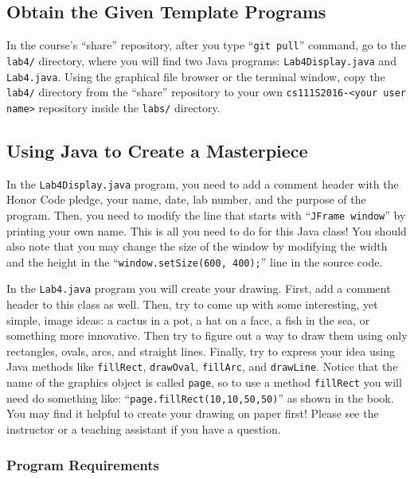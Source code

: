 \vspace{-0.05in}
\subsection*{Obtain the Given Template Programs}
\vspace{-0.05in}

In the course's ``share'' repository, after you type ``{\tt git pull}'' command, go to the {\tt lab4/} directory, where
you will find two Java programs: {\tt Lab4Display.java} and {\tt Lab4.java}. Using the graphical file browser or the
terminal window, copy the {\tt lab4/} directory from the ``share'' repository to your own {\tt cs111S2016-<your user
name>} repository inside the {\tt labs/} directory.

\subsection*{Using Java to Create a Masterpiece}

In the {\tt Lab4Display.java} program, you need to add a comment header with the Honor Code pledge, your name, date, lab
number, and the purpose of the program. Then, you need to modify the line that starts with ``{\tt JFrame window}'' by
printing your own name. This is all you need to do for this Java class! You should also note that you may change the size of
the window by modifying the width and the height in the ``{\tt window.setSize(600, 400);}'' line in the source code.

In the {\tt Lab4.java} program you will create your drawing. First, add a comment header to this class as well.  Then,
try to come up with some interesting, yet simple, image ideas: a cactus in a pot, a hat on a face, a fish in the sea, or
something more innovative.  Then try to figure out a way to draw them using only rectangles, ovals, arcs, and straight
lines.  Finally, try to express your idea using Java methods like {\tt fillRect}, {\tt drawOval}, {\tt fillArc}, and
{\tt drawLine}. Notice that the name of the graphics object is called {\tt page}, so to use a method {\tt fillRect} you
will need do something like: ``{\tt page.fillRect(10,10,50,50)}'' as shown in the book.  You may find it helpful to create
your drawing on paper first! Please see the instructor or a teaching assistant if you have a question.

\vspace*{-.1in}
\subsubsection*{Program Requirements}

